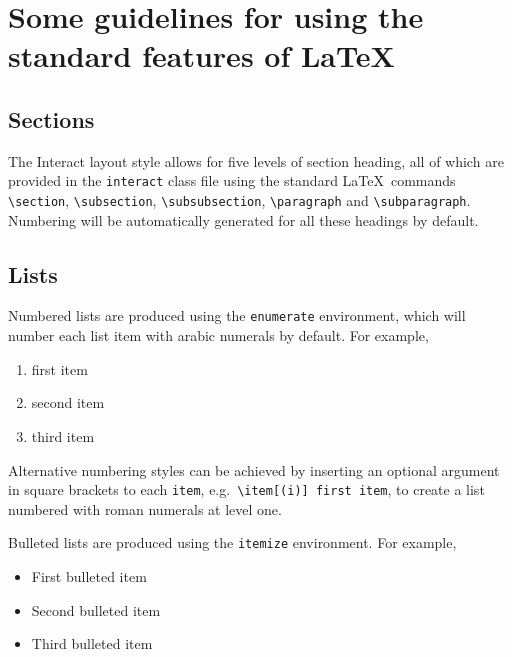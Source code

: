 \documentclass[]{interact}
\theoremstyle{plain}%
\theoremstyle{definition}
\theoremstyle{remark}
\def\tightlist{}
\begin{document}
\hypertarget{some-guidelines-for-using-the-standard-features-of}{%
\section{\texorpdfstring{Some guidelines for using the standard features of \LaTeX}{Some guidelines for using the standard features of }}\label{some-guidelines-for-using-the-standard-features-of}}

\hypertarget{sections}{%
\subsection{Sections}\label{sections}}

The \textsf{Interact} layout style allows for five levels of section heading, all of which are provided in the \texttt{interact} class file using the standard \LaTeX~commands \texttt{\textbackslash{}section}, \texttt{\textbackslash{}subsection}, \texttt{\textbackslash{}subsubsection}, \texttt{\textbackslash{}paragraph} and \texttt{\textbackslash{}subparagraph}. Numbering will be automatically generated for all these headings by default.

\hypertarget{lists}{%
\subsection{Lists}\label{lists}}

Numbered lists are produced using the \texttt{enumerate} environment, which will number each list item with arabic numerals by default. For example,

\begin{enumerate}
\def\labelenumi{\arabic{enumi}.}
\tightlist
\item
  first item
\item
  second item
\item
  third item
\end{enumerate}

Alternative numbering styles can be achieved by inserting an optional argument in square brackets to each \texttt{item}, e.g.~\texttt{\textbackslash{}item{[}(i){]}\ first\ item}, to create a list numbered with roman numerals at level one.

Bulleted lists are produced using the \texttt{itemize} environment. For example,

\begin{itemize}
\tightlist
\item
  First bulleted item
\item
  Second bulleted item
\item
  Third bulleted item
\end{itemize}
\end{document}
